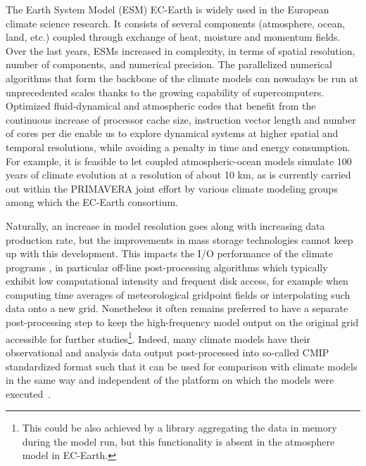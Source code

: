 \documentclass[procedia]{easychair}
\begin{document}

The Earth System Model (ESM) EC-Earth \cite{ECEARTHv22} is widely used in the 
European climate science research. It consists of several components 
(atmosphere, ocean, land, etc.) coupled through exchange of heat, moisture and 
momentum fields. Over the last years, ESMs increased in complexity, in terms of 
spatial resolution, number of components, and numerical precision. 
%
The parallelized numerical algorithms that form the backbone of the climate 
models
can nowadays be run at unprecedented scales thanks to the
growing capability of supercomputers. Optimized fluid-dynamical and atmospheric 
codes that benefit from the continuous increase of processor cache size, 
instruction vector length and number of cores per die enable us to explore 
dynamical systems at higher spatial and temporal resolutions, while avoiding a 
penalty in time and energy consumption. For example, it is feasible to let 
coupled atmospheric-ocean models simulate 100 years of climate evolution at a 
resolution of about 10 km, as is currently carried out within the PRIMAVERA 
joint effort \cite{PRIMAVERA} by various climate modeling groups among which 
the 
EC-Earth consortium.

Naturally, an increase in model resolution goes along with increasing data 
production rate, but the improvements in mass storage technologies cannot keep 
up with this development. This impacts the I/O performance of the climate 
programs \cite{Asif20142370}, in particular off-line post-processing algorithms 
which typically exhibit low computational intensity and frequent disk access, 
for example when computing time averages of meteorological gridpoint fields or 
interpolating such data onto a new grid.
Nonetheless it often remains preferred to have a separate post-processing step 
to keep the high-frequency model output on the original grid accessible for 
further studies\footnote{This could be also achieved by a library aggregating 
the data in memory during the model run, but this functionality is absent in 
the atmosphere model in EC-Earth.}. Indeed, many climate models have their 
observational and analysis data output post-processed into so-called CMIP 
standardized format such that it can be used for comparison with climate models 
in
the same way and independent of the platform on which the models were 
executed~\cite{CMIP6}.
 
\end{document}
